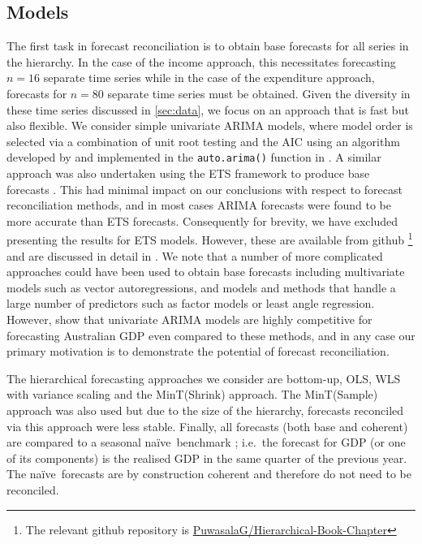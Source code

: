 \documentclass[a4paper, 11pt]{article}
\def\naive{na\"{i}ve\ }
\begin{document}
\subsection{Models}

The first task in forecast reconciliation is to obtain base forecasts for all series in the hierarchy. In the case of the income approach, this necessitates forecasting $n=16$ separate time series while in the case of the expenditure approach, forecasts for $n=80$ separate time series must be obtained. Given the diversity in these time series discussed in \autoref{sec:data}, we focus on an approach that is fast but also flexible. We consider simple univariate ARIMA models, where model order is selected via a combination of unit root testing and the AIC using an algorithm developed by \citet{HK08} and implemented in the \verb|auto.arima()| function in \citet{Rforecast}. A similar approach was also undertaken using the ETS framework to produce base forecasts \citep{expsmooth08}. This had minimal impact on our conclusions with respect to forecast reconciliation methods, and in most cases ARIMA forecasts were found to be more accurate than ETS forecasts. Consequently for brevity, we have excluded presenting the results for ETS models. However, these are available from github \footnote {The relevant github repository is \href{https://github.com/PuwasalaG/Hierarchical-Book-Chapter}{PuwasalaG/Hierarchical-Book-Chapter}} and are discussed in detail in \cite{gamakumara2019phd}. We note that a number of more complicated approaches could have been used to obtain base forecasts including multivariate models such as vector autoregressions, and models and methods that handle a large number of predictors such as factor models or least angle regression. However, \citet{PanEtAl2019} show that univariate ARIMA models are highly competitive for forecasting Australian GDP even compared to these methods, and in any case our primary motivation is to demonstrate the potential of forecast reconciliation.

The hierarchical forecasting approaches we consider are bottom-up, OLS, WLS with variance scaling and the MinT(Shrink) approach. The MinT(Sample) approach was also used but due to the size of the hierarchy, forecasts reconciled via this approach were less stable. Finally, all forecasts (both base and coherent) are compared to a seasonal \naive benchmark \citep{HynAth2018}; i.e.\ the forecast for GDP (or one of its components) is the realised GDP in the same quarter of the previous year. The \naive forecasts are by construction coherent and therefore do not need to be reconciled.
\end{document}
